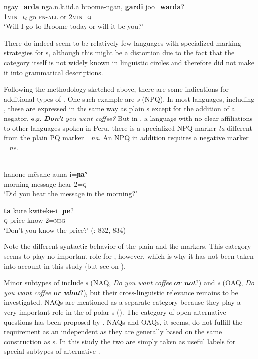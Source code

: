    \ex
    \gll ngay=\textbf{{arda}} nga.n.k.iid.a  broome-ngan, \textbf{{gardi}} joo=\textbf{{warda}}?\\
    1\textsc{min}=\textsc{q}  go    \textsc{pn}-\textsc{all}    or  2\textsc{min}=\textsc{q}\\
    \glt ‘Will I go to Broome today or will it be you?’ \citep[619]{Bowern2012}
    \z
    \z

\noindent There do indeed seem to be relatively few languages with specialized marking strategies for s, although this might be a distortion due to the fact that the category itself is not widely known in linguistic circles and therefore did not make it into grammatical descriptions.

Following the methodology sketched above, there are some indications for additional types of . One such example are \textit{s} (NPQ). In most languages, including , these are expressed in the same way as plain s except for the addition of a negator, e.g. \textbf{\textit{Don’t}} \textit{you want coffee?} But in , a language with no clear affiliations to other languages spoken in Peru, there is a specialized NPQ marker \textit{ta} different from the plain PQ marker \textit{=na}. An NPQ in addition requires a negative marker \textit{=ne}.

\ea%
    \label{ex:4:4}
    \ea
    \\
    \gll hanone    mẽsahe    auna-i=\textbf{{ɲa}}?\\
    morning  message  hear-2=\textsc{q}\\
    \glt ‘Did you hear the message in the morning?’

    \ex
    \gll \textbf{{ta}} kure  kwitʉkʉ-i=\textbf{{ɲe}}?\\
    \textsc{q}  price  know-2=\textsc{neg}\\
    \glt ‘Don’t you know the price?’ (\citealt{Olawsky2006}: 832, 834)
    \z
    \z

\noindent Note the different syntactic behavior of the plain and the  markers. This category seems to play no important role for , however, which is why it has not been taken into account in this study (but see  on ).

\newpage 
Minor subtypes of  include \textit{s} (NAQ, \textit{Do you want coffee} \textbf{\textit{or not}}?) and \textit{s} (OAQ, \textit{Do you want coffee} \textbf{\textit{or what}}?), but their cross-linguistic relevance remains to be investigated. NAQs are mentioned as a separate category because they play a very important role in the  of polar s (). The category of open alternative questions has been proposed by \citet{TolskayaTolskaya2008}. NAQs and OAQs, it seems, do not fulfill the requirement as an independent  as they are generally based on the same construction as s. In this study the two are simply taken as useful labels for special subtypes of alternative .

